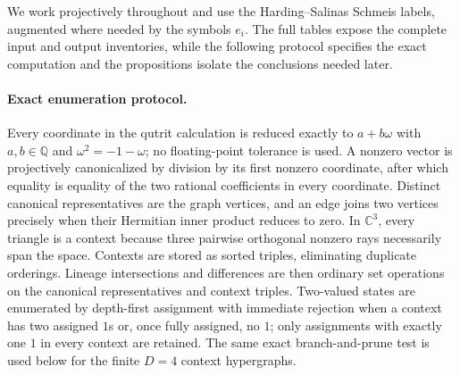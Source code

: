 \documentclass[%
  reprint,
  superscriptaddress,
  showpacs,
  showkeys,
  amsmath,amssymb,
  pra,
  longbibliography,
  floatfix,
  x11names
]{revtex4-2}
\newenvironment{revision}{\begingroup\color{revisionblue}}{\endgroup}
\begin{document}
\begin{revision}
We work projectively throughout and use the Harding--Salinas Schmeis labels, augmented where needed by the symbols $e_i$.  The full tables expose the complete input and output inventories, while the following protocol specifies the exact computation and the propositions isolate the conclusions needed later.

\paragraph{Exact enumeration protocol.}
Every coordinate in the qutrit calculation is reduced exactly to $a+b\omega$ with $a,b\in\mathbb{Q}$ and $\omega^2=-1-\omega$; no floating-point tolerance is used.  A nonzero vector is projectively canonicalized by division by its first nonzero coordinate, after which equality is equality of the two rational coefficients in every coordinate.  Distinct canonical representatives are the graph vertices, and an edge joins two vertices precisely when their Hermitian inner product reduces to zero.  In $\mathbb{C}^3$, every triangle is a context because three pairwise orthogonal nonzero rays necessarily span the space.  Contexts are stored as sorted triples, eliminating duplicate orderings.  Lineage intersections and differences are then ordinary set operations on the canonical representatives and context triples.  Two-valued states are enumerated by depth-first assignment with immediate rejection when a context has two assigned $1$s or, once fully assigned, no $1$; only assignments with exactly one $1$ in every context are retained.  The same exact branch-and-prune test is used below for the finite $D=4$ context hypergraphs.
\end{revision}
\end{document}
